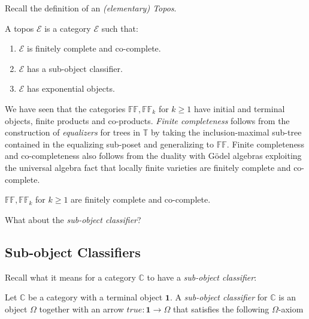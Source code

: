 Recall the definition of an \emph{(elementary) Topos}.
\begin{definition}[Topos]
	A topos $\mathcal{E}$ is a category $\mathcal{E}$ such that:
	\begin{enumerate}
		\item $\mathcal{E}$ is finitely complete and co-complete.
		\item $\mathcal{E}$ has a sub-object classifier.
		\item $\mathcal{E}$ has exponential objects.
	\end{enumerate}
	
\end{definition}
 
We have seen that the categories $\mathbb{FF}, \mathbb{FF}_{k}$ for $k\geq1$ have initial and terminal objects, finite products and co-products. \newline
 \emph{Finite completeness} follows from the construction of \emph{equalizers} for trees in $\mathbb{T}$ by taking the inclusion-maximal sub-tree contained in the equalizing sub-poset and generalizing to $\mathbb{FF}$. \newline Finite completeness and co-completeness also follows from the duality with Gödel algebras exploiting the universal algebra fact that locally finite varieties are finitely complete and co-complete.
 
 \begin{lem}\label{lem:ffcomplete}
 	$\mathbb{FF}, \mathbb{FF}_{k}$ for $k\geq1$ are finitely complete and co-complete.
 \end{lem}
 

What about the \emph{sub-object classifier}?
\newpage
\subsection{Sub-object Classifiers}

Recall what it means for a category $\mathbb{C}$ to have a \emph{sub-object classifier}:

\begin{definition}
	Let $\mathbb{C}$ be a category with a terminal object $\mathbf{1}$. 
	A \emph{sub-object classifier} for $\mathbb{C}$ is an object $\Omega$ together with an arrow $true: \mathbf{1} \rightarrow \Omega$ that satisfies the following $\Omega$-axiom 
\end{definition}

